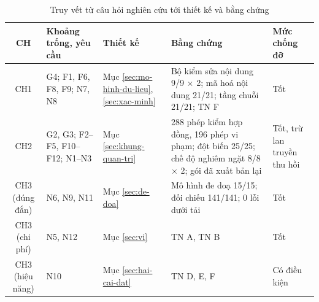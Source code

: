 \begin{table}[H]
\centering
\caption{Truy vết từ câu hỏi nghiên cứu tới thiết kế và bằng chứng}
\label{tab:v2-trace}
\renewcommand{\arraystretch}{1.2}
\small
\begin{tabular}{|c|p{2.3cm}|p{2.6cm}|p{4.6cm}|p{1.9cm}|}
\hline
\textbf{CH} & \textbf{Khoảng trống, yêu cầu} & \textbf{Thiết kế} & \textbf{Bằng chứng} & \textbf{Mức chống đỡ} \\ \hline
CH1 & G4; F1, F6, F8, F9; N7, N8 & Mục \ref{sec:mo-hinh-du-lieu}, \ref{sec:xac-minh} & Bộ kiểm sửa nội dung 9/9 $\times$ 2; mã hoá nội dung 21/21; tầng chuỗi 21/21; TN F & Tốt \\ \hline
CH2 & G2, G3; F2--F5, F10--F12; N1--N3 & Mục \ref{sec:khung-quan-tri} & 288 phép kiểm hợp đồng, 196 phép vi phạm; đột biến 25/25; chế độ nghiêm ngặt 8/8 $\times$ 2; gói đã xuất bản lại & Tốt, trừ lan truyền thu hồi \\ \hline
CH3 (đúng đắn) & N6, N9, N11 & Mục \ref{sec:de-doa} & Mô hình đe doạ 15/15; đối chiếu 141/141; 0 lỗi dưới tải & Tốt \\ \hline
CH3 (chi phí) & N5, N12 & Mục \ref{sec:vi} & TN A, TN B & Tốt \\ \hline
CH3 (hiệu năng) & N10 & Mục \ref{sec:hai-cai-dat} & TN D, E, F & Có điều kiện \\ \hline
\end{tabular}
\end{table}
